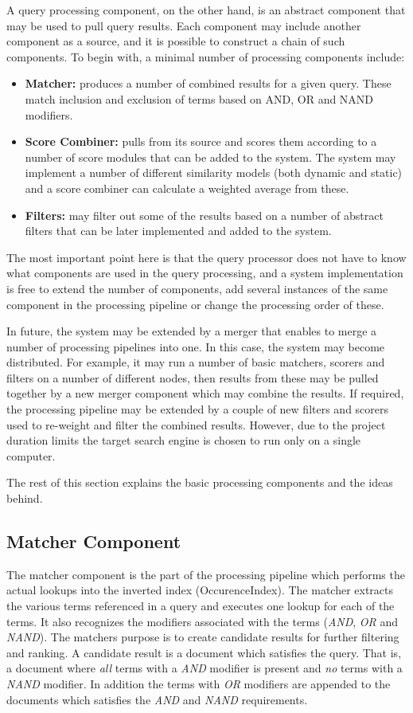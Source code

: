A query processing component, on the other hand, is an abstract component that may be used to pull query results. Each component may include another component as a source, and it is possible to construct a chain of such components. To begin with, a minimal number of processing components include:
\begin{itemize}
	\item {\bf Matcher:} produces a number of combined results for a given query. These match inclusion and exclusion of terms based on AND, OR and NAND modifiers.
	\item {\bf Score Combiner:} pulls from its source and scores them according to a number of score modules that can be added to the system. The system may implement a number of different similarity models (both dynamic and static) and a score combiner can calculate a weighted average from these.
	\item {\bf Filters:} may filter out some of the results based on a number of abstract filters that can be later implemented and added to the system.
\end{itemize}

The most important point here is that the query processor does not have to know what components are used in the query processing, and a system implementation is free to extend the number of components, add several instances of the same component in the processing pipeline or change the processing order of these. 

In future, the system may be extended by a merger that enables to merge a number of processing pipelines into one. In this case, the system may become distributed. For example, it may run a number of basic matchers, scorers and filters on a number of different nodes, then results from these may be pulled together by a new merger component which may combine the results. If required, the processing pipeline may be extended by a couple of new filters and scorers used to re-weight and filter the combined results. However, due to the project duration limits the target search engine is chosen to run only on a single computer.

The rest of this section explains the basic processing components and the ideas behind.

\subsection{Matcher Component}
The matcher component is the part of the processing pipeline which performs the actual lookups into the inverted index (OccurenceIndex). The matcher extracts the various terms referenced in a query and executes one lookup for each of the terms. It also recognizes the modifiers associated with the terms (\emph{AND}, \emph{OR} and \emph{NAND}). The matchers purpose is to create candidate results for further filtering and ranking. A candidate result is a document which satisfies the query. That is, a document where \emph{all} terms with a \emph{AND} modifier is present and \emph{no} terms with a \emph{NAND} modifier. In addition the terms with \emph{OR} modifiers are appended to the documents which satisfies the \emph{AND} and \emph{NAND} requirements.

